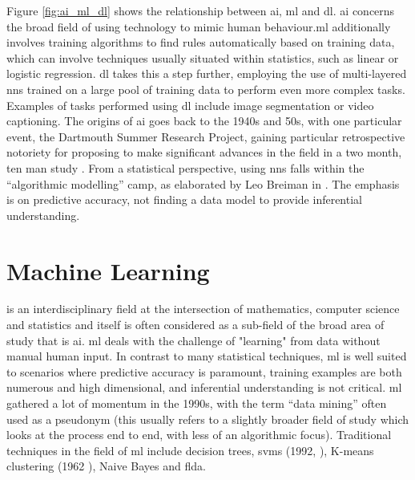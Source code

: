 Figure \ref{fig:ai_ml_dl} shows the relationship between \gls{ai}, \gls{ml} and \gls{dl}. \gls{ai} concerns the broad field of using technology to mimic human behaviour.\gls{ml} additionally involves training algorithms to find rules automatically based on training data, which can involve techniques usually situated within statistics, such as linear or logistic regression. \gls{dl} takes this a step further, employing the use of multi-layered \gls{nn}s trained on a large pool of training data to perform even more complex tasks. Examples of tasks performed using \gls{dl} include image segmentation or video captioning. The origins of \gls{ai} goes back to the 1940s and 50s, with one particular event, the Dartmouth Summer Research Project, gaining particular retrospective notoriety for proposing to make significant advances in the field in a two month, ten man study \cite{dartmouth_summer}. From a statistical perspective, using \gls{nn}s falls within the \enquote{algorithmic modelling} camp, as elaborated by Leo Breiman in \cite{two_cultures}. The emphasis is on predictive accuracy, not finding a data model to provide inferential understanding.

\section{Machine Learning}


 is an interdisciplinary field at the intersection of mathematics, computer science and statistics and itself is often considered as a sub-field of the broad area of study that is \gls{ai}. \gls{ml} deals with the challenge of "learning" from data without manual human input. In contrast to many statistical techniques, \gls{ml} is well suited to scenarios where predictive accuracy is paramount, training examples are both numerous and high dimensional, and inferential understanding is not critical. \gls{ml} gathered a lot of momentum in the 1990s, with the term \enquote{data mining} often used as a pseudonym (this usually refers to a slightly broader field of study which looks at the process end to end, with less of an algorithmic focus). Traditional techniques in the field of \gls{ml} include decision trees,  \gls{svm}s (1992, \cite{svm}), K-means clustering (1962 \cite{k_means}), Naive Bayes and  \gls{flda}.  
\bigskip

